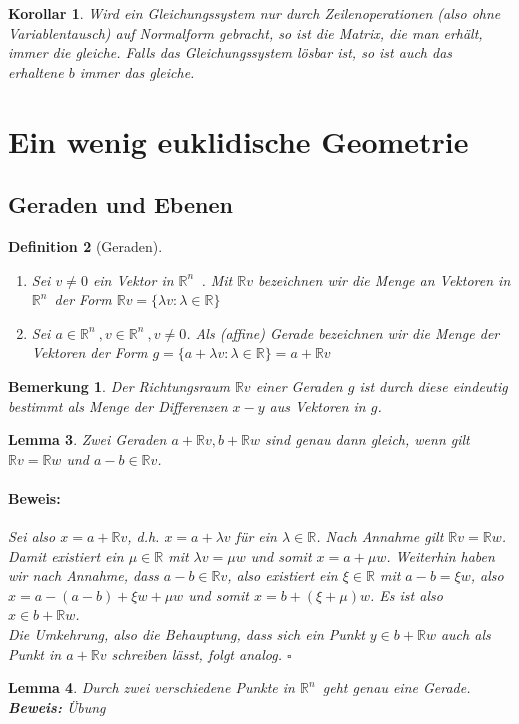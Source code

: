 \documentclass{report}
\newcommand{\lb}{\lambda}
\newcommand{\R}{\mathbb{R}}
\newcommand{\Rn}{\mathbb{R}^n\ }
\newcommand{\mRn}{$\mathbb{R}^n$\ }
\theoremstyle{customrem}
\newtheorem*{bem}{Bemerkung}
\theoremstyle{customdef}
\newtheorem{definition}{Definition}[chapter]
\newtheorem{lem}[definition]{Lemma}
\newtheorem{kor}[definition]{Korollar}
\renewenvironment{proof}{\vspace{-.75cm}\paragraph{Beweis: }}{\hfill$\square$}
\begin{document}
	\begin{kor}
		Wird ein Gleichungssystem \textit{nur} durch Zeilenoperationen (also ohne Variablentausch) auf Normalform gebracht, so ist die Matrix, die man erhält, immer die gleiche. Falls das Gleichungssystem lösbar ist, so ist auch das erhaltene $b$ immer das gleiche.
	\end{kor}

\section{Ein wenig euklidische Geometrie}

\subsection{Geraden und Ebenen}
	\begin{definition}[Geraden]
		$ $\vspace{-.5cm}
		\begin{enumerate}
			\item Sei $v \not= 0$ ein Vektor in \mRn. Mit $\R v$ bezeichnen wir die Menge an Vektoren in \mRn der Form $\R v = \{\lb v : \lb \in \R\}$
			\item Sei $a \in \Rn, v \in \Rn, v \neq 0$. Als (affine) Gerade bezeichnen wir die Menge der Vektoren der Form $g = \{a + \lb v : \lb \in \R\} = a + \R v$
		\end{enumerate}
	\end{definition}
	
	\begin{bem}
		Der Richtungsraum $\R v$ einer Geraden $g$ ist durch diese eindeutig bestimmt als Menge der Differenzen $x - y$ aus Vektoren in $g$.
	\end{bem}
	
	\begin{lem}
		Zwei Geraden $a + \R v, b + \R w$ sind genau dann gleich, wenn gilt $\R v = \R w$ und $a - b \in \R v$.\\
		\begin{proof}
			Sei also  $x = a + \R v$, d.h. $x = a + \lb v$ für ein $\lb \in \R$. Nach Annahme gilt $\R v = \R w$. Damit existiert ein $\mu \in \R$ mit $\lb v = \mu w$ und somit $x = a + \mu w$. Weiterhin haben wir nach Annahme, dass $a-b \in \R v$, also existiert ein $\xi \in \R$ mit $a - b = \xi w$, also $x = a - (a - b) + \xi w + \mu w$ und somit $x = b + (\xi + \mu) w$.
			Es ist also $x \in b + \R w$.\\
			Die Umkehrung, also die Behauptung, dass sich ein Punkt $y \in b + \R w$ auch als Punkt in $a + \R v$ schreiben lässt, folgt analog.
		\end{proof}
	\end{lem}
	\begin{lem}
		Durch zwei verschiedene Punkte in \mRn geht genau eine Gerade.\\
		\textbf{Beweis: } Übung
	\end{lem}
\end{document}
